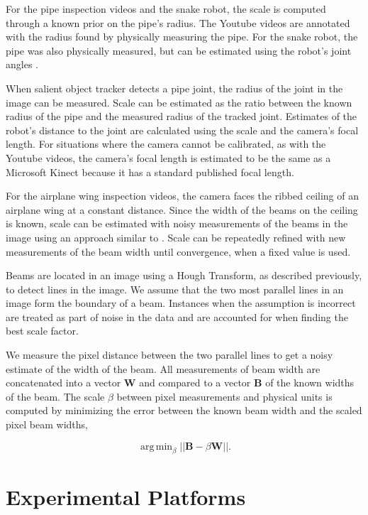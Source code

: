 \documentclass[letterpaper, 10 pt, conference]{ieeeconf}
\DeclareMathOperator*{\argmin}{arg\,min}
\begin{document}
For the pipe inspection videos and the snake robot, the scale is computed through a known prior on the pipe's radius. The Youtube videos are annotated with the radius found by physically measuring the pipe. For the snake robot, the pipe was also physically measured, but can be estimated using the robot's joint angles \cite{Enner2013}.

When salient object tracker detects a pipe joint, the radius of the joint in the image can be measured. Scale can be estimated as the ratio between the known radius of the pipe and the measured radius of the tracked joint. Estimates of the robot's distance to the joint are calculated using the scale and the camera's focal length. For situations where the camera cannot be calibrated, as with the Youtube videos, the camera's focal length is estimated to be the same as a Microsoft Kinect because it has a standard published focal length.

For the airplane wing inspection videos, the camera faces the ribbed ceiling of an airplane wing at a constant distance. Since the width of the beams on the ceiling is known, scale can be estimated with noisy measurements of the beams in the image using an approach similar to \cite{Lucey14}. Scale can be repeatedly refined with new measurements of the beam width until convergence, when a fixed value is used.

Beams are located in an image using a Hough Transform, as described previously, to detect lines in the image. We assume that the two most parallel lines in an image form the boundary of a beam. Instances when the assumption is incorrect are treated as part of noise in the data and are accounted for when finding the best scale factor.

We measure the pixel distance between the two parallel lines to get a noisy estimate of the width of the beam. All measurements of beam width are concatenated into a vector $\textbf{W}$ and compared to a vector $\textbf{B}$ of the known widths of the beam. The scale $\beta$ between pixel measurements and physical units is computed by minimizing the error between the known beam width and the scaled pixel beam widths,

\begin{equation}
	\argmin_{\beta} ||\textbf{B} - \beta \textbf{W} ||.
\end{equation}


\section{Experimental Platforms}
\end{document}
